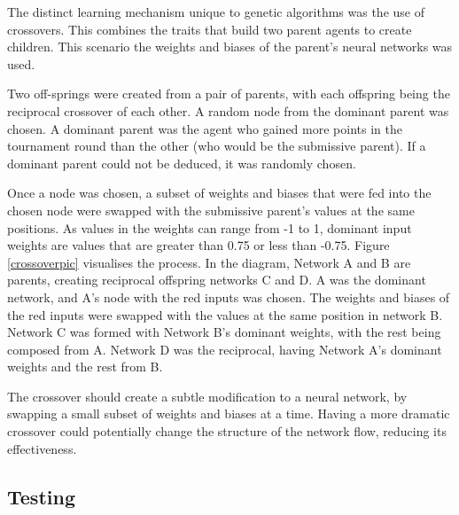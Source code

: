 \documentclass[12pt,a4paper]{article}
\begin{document}
            The distinct learning mechanism unique to genetic algorithms was the use of crossovers. This combines the traits that build two parent agents to create children. This scenario the weights and biases of the parent's neural networks was used.

            Two off-springs were created from a pair of parents, with each offspring being the reciprocal crossover of each other. 
            A random node from the dominant parent was chosen. A dominant parent was the agent who gained more points in the tournament round than the other (who would be the submissive parent). If a dominant parent could not be deduced, it was randomly chosen. 

            Once a node was chosen, a subset of weights and biases that were fed into the chosen node were swapped with the submissive parent's values at the same positions. As values in the weights can range from -1 to 1, dominant input weights are values that are greater than 0.75 or less than -0.75. Figure \ref{crossoverpic} visualises the process. In the diagram, Network A and B are parents, creating reciprocal offspring networks C and D. A was the dominant network, and A's node with the red inputs was chosen. The weights and biases of the red inputs were swapped with the values at the same position in network B. Network C was formed with Network B's dominant weights, with the rest being composed from A. Network D was the reciprocal, having Network A's dominant weights and the rest from B.

            The crossover should create a subtle modification to a neural network, by swapping a small subset of weights and biases at a time. Having a more dramatic crossover could potentially change the structure of the network flow, reducing its effectiveness. 
            

    \subsection{Testing}
\end{document}
